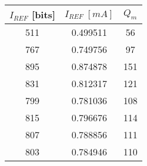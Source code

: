 \begin{tabular}{ccc}
\toprule
$I_{REF}$ [bits] & $I_{REF} \; [mA]$ & $Q_m$ \\
\midrule
                511 &          0.499511 &    56 \\
                767 &          0.749756 &    97 \\
                895 &          0.874878 &   151 \\
                831 &          0.812317 &   121 \\
                799 &          0.781036 &   108 \\
                815 &          0.796676 &   114 \\
                807 &          0.788856 &   111 \\
                803 &          0.784946 &   110 \\
\bottomrule
\end{tabular}
